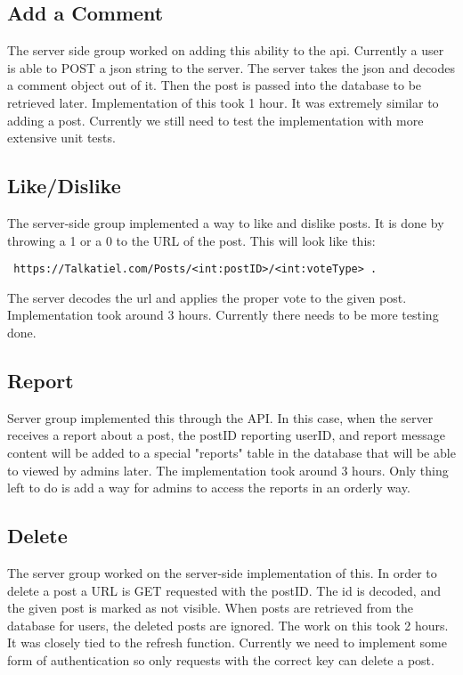 \documentclass[12pt]{article}
\begin{document}
      \subsection{Add a Comment}
      The server side group worked on adding this ability to the api.  Currently a user is able to POST a json string to the server.  The server takes the json and decodes a comment object out of it.  Then the post is passed into the database to be retrieved later.  Implementation of this took 1 hour.  It was extremely similar to adding a post.  Currently we still need to test the implementation with more extensive unit tests.
      \subsection{Like/Dislike}
      The server-side group implemented a way to like and dislike posts.  It is done by throwing a 1 or a 0 to the URL of the post.  This will look like this:\begin{verbatim} https://Talkatiel.com/Posts/<int:postID>/<int:voteType> .\end{verbatim}  The server decodes the url and applies the proper vote to the given post.  Implementation took around 3 hours.  Currently there needs to be more testing done.
      \subsection{Report}
      Server group implemented this through the API.  In this case, when the server receives a report about a post, the postID reporting userID, and report message content will be added to a special "reports" table in the database that will be able to viewed by admins later. The implementation took around 3 hours.  Only thing left to do is add a way for admins to access the reports in an orderly way.
      \subsection{Delete}
      The server group worked on the server-side implementation of this.  In order to delete a post a URL is GET requested with the postID.  The id is decoded, and the given post is marked as not visible.  When posts are retrieved from the database for users, the deleted posts are ignored.  The work on this took 2 hours.  It was closely tied to the refresh function.  Currently we need to implement some form of authentication so only requests with the correct key can delete a post.
\end{document}
